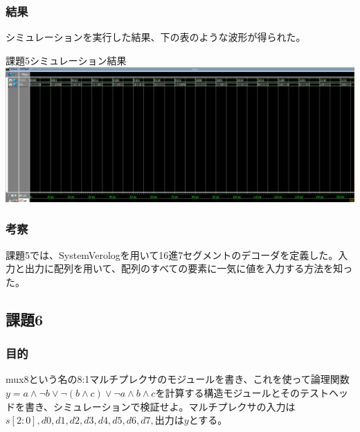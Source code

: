 \documentclass[a4paper]{jarticle}
\begin{document}
\subsubsection{結果}
シミュレーションを実行した結果、下の表のような波形が得られた。
\begin{center}
	課題5シミュレーション結果
	\includegraphics[width=15cm]{5-m.PNG}
\end{center}
\subsubsection{考察}
課題5では、SystemVerologを用いて16進7セグメントのデコーダを定義した。入力と出力に配列を用いて、配列のすべての要素に一気に値を入力する方法を知った。
\subsection{課題6}
\subsubsection{目的}
mux8という名の8:1マルチプレクサのモジュールを書き、これを使って論理関数$y = a \land \lnot b \lor \lnot \left( b \land c \right) \lor \lnot a \land b \land c$を計算する構造モジュールとそのテストヘッドを書き、シミュレーションで検証せよ。マルチプレクサの入力は$s\left[ 2:0 \right],d0,d1,d2,d3,d4,d5,d6,d7,$出力は$y$とする。
\end{document}
